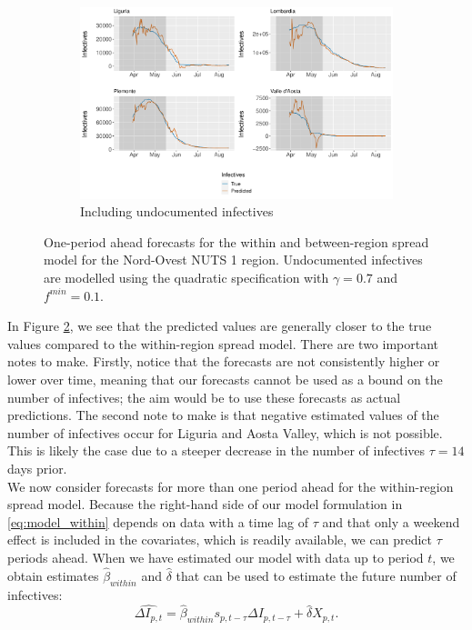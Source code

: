 \documentclass[12pt]{article}
\begin{document}
    \begin{figure}[H]\ContinuedFloat
	    \begin{subfigure}{\textwidth}
	      \centering
	      \includegraphics[width=0.94\linewidth]{output/model_between_lag14_forecast_start20_Nord-Ovest_UndocQuadratic_rolling.pdf}
	      \caption{Including undocumented infectives}
	      \label{fig:forecast_between_nordovest_undoc}
	    \end{subfigure}
	    \caption{One-period ahead forecasts for the within and between-region spread model for the Nord-Ovest NUTS 1 region. Undocumented infectives are modelled using the quadratic specification with $\gamma = 0.7$ and $f^{min}=0.1$.}
	    \label{fig:forecast_between_nordovest}
    \end{figure}
	
	In Figure \ref{fig:forecast_between_nordovest}, we see that the predicted values are generally closer to the true values compared to the within-region spread model. There are two important notes to make. Firstly, notice that the forecasts are not consistently higher or lower over time, meaning that our forecasts cannot be used as a bound on the number of infectives; the aim would be to use these forecasts as actual predictions. The second note to make is that negative estimated values of the number of infectives occur for Liguria and Aosta Valley, which is not possible. This is likely the case due to a steeper decrease in the number of infectives $\tau = 14$ days prior. \\
	
	We now consider forecasts for more than one period ahead for the within-region spread model. Because the right-hand side of our model formulation in \eqref{eq:model_within} depends on data with a time lag of $\tau$ and that only a weekend effect is included in the covariates, which is readily available, we can predict $\tau$ periods ahead. When we have estimated our model with data up to period $t$, we obtain estimates $\widehat{\beta}_{within}$ and $\widehat{\delta}$ that can be used to estimate the future number of infectives:
	    \[\widehat{\Delta I_{p,t}} = \widehat{\beta}_{within} s_{p,t-\tau} \Delta I_{p,t-\tau} + \widehat{\delta} X_{p,t}.\]
	    
\end{document}
